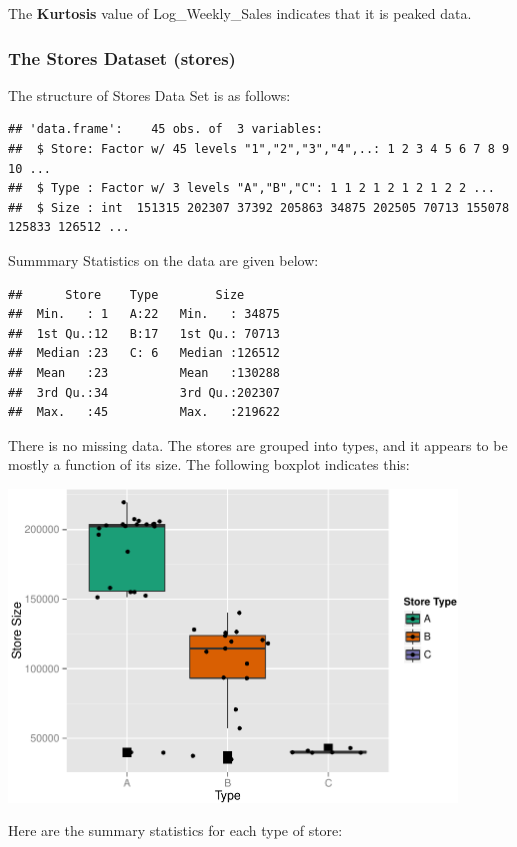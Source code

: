 \documentclass[]{article}
\begin{document}
The \textbf{Kurtosis} value of Log\_Weekly\_Sales indicates that it is
peaked data.

\subsubsection{The Stores Dataset
(stores)}\label{the-stores-dataset-stores}

The structure of Stores Data Set is as follows:

\begin{verbatim}
## 'data.frame':    45 obs. of  3 variables:
##  $ Store: Factor w/ 45 levels "1","2","3","4",..: 1 2 3 4 5 6 7 8 9 10 ...
##  $ Type : Factor w/ 3 levels "A","B","C": 1 1 2 1 2 1 2 1 2 2 ...
##  $ Size : int  151315 202307 37392 205863 34875 202505 70713 155078 125833 126512 ...
\end{verbatim}

Summmary Statistics on the data are given below:

\begin{verbatim}
##      Store    Type        Size       
##  Min.   : 1   A:22   Min.   : 34875  
##  1st Qu.:12   B:17   1st Qu.: 70713  
##  Median :23   C: 6   Median :126512  
##  Mean   :23          Mean   :130288  
##  3rd Qu.:34          3rd Qu.:202307  
##  Max.   :45          Max.   :219622
\end{verbatim}

There is no missing data. The stores are grouped into types, and it
appears to be mostly a function of its size. The following boxplot
indicates this:

\includegraphics[width=450px]{PredictingWeeklySalesAtWalmart_files/figure-latex/storeSizeBoxPlot-1}

Here are the summary statistics for each type of store:
\end{document}
